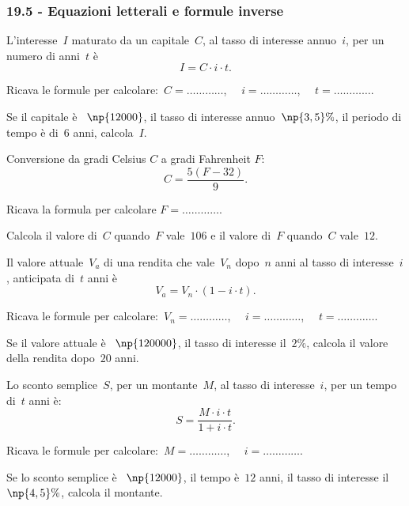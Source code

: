 \subsubsection*{19.5 - Equazioni letterali e formule inverse}

\begin{esercizio}
\label{ese:19.26}
L'interesse~$I$ maturato da un capitale~$C$, al tasso di interesse annuo~$i$, per un numero di anni~$t$ è
\begin{equation*}
  I=C\cdot i\cdot t.
\end{equation*}

Ricava le formule per calcolare:~$C=\ldots\ldots\ldots\ldots$, $\quad i=\ldots\ldots\ldots\ldots$, $\quad t =\ldots\ldots\ldots\ldots$.

Se il capitale è \officialeuro~$\np{12000}$, il tasso di interesse annuo~$\np{3,5}\%$, il periodo di tempo è di~$6$ anni, calcola~$I$.
\end{esercizio}

\begin{esercizio}
\label{ese:19.27}
Conversione da gradi Celsius $C$ a gradi Fahrenheit $F$:
\begin{equation*}
  C=\frac{5(F-32)}{9}.
\end{equation*}

Ricava la formula per calcolare $F=\ldots\ldots\ldots\ldots$.

Calcola il valore di~$C$ quando~$F$ vale~$106$ e il valore di~$F$ quando~$C$ vale~$12$.
\end{esercizio}

\begin{esercizio}
\label{ese:19.28}
Il valore attuale~$V_a$ di una rendita che vale~$V_n$ dopo~$n$ anni al tasso di interesse~$i$, anticipata di~$t$ anni è
\begin{equation*}
  V_{a}=V_{n}\cdot (1-i\cdot t).
\end{equation*}

Ricava le formule per calcolare:~$V_n=\ldots\ldots\ldots\ldots$, $\quad i=\ldots\ldots\ldots\ldots$, $\quad t =\ldots\ldots\ldots\ldots$.

Se il valore attuale è \officialeuro~$\np{120000}$, il tasso di interesse il~$2\%$, calcola il valore della rendita dopo~$20$ anni.
\end{esercizio}

\begin{esercizio}
\label{ese:19.29}
Lo sconto semplice~$S$, per un montante~$M$, al tasso di interesse~$i$, per un tempo di~$t$ anni è:
\begin{equation*}
  S=\frac{M\cdot i\cdot t}{1+i\cdot t}.
\end{equation*}

Ricava le formule per calcolare:~$M=\ldots\ldots\ldots\ldots$, $\quad i=\ldots\ldots\ldots\ldots$.

Se lo sconto semplice è \officialeuro~$\np{12000}$, il tempo è~$12$ anni, il tasso di interesse il~$\np{4,5}\%$, calcola il montante.
\end{esercizio}

